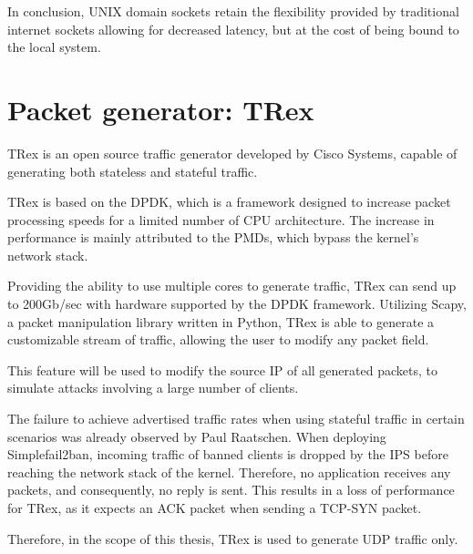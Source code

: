 In conclusion, UNIX domain sockets retain the flexibility provided by traditional internet sockets allowing for decreased latency, but at the cost of being bound to the local system.

\section{Packet generator: TRex}
TRex is an open source traffic generator developed by Cisco Systems, capable of generating both stateless and stateful traffic\cite{trex}.

TRex is based on the \ac{DPDK}, which is a framework designed to increase packet processing speeds for a limited number of \ac{CPU} architecture.
The increase in performance is mainly attributed to the \ac{PMDs}, which bypass the kernel's network stack.\cite{dpdk}

Providing the ability to use multiple cores to generate traffic, TRex can send up to 200Gb/sec with hardware supported by the \ac{DPDK} framework.
Utilizing Scapy, a packet manipulation library written in Python\cite{scapy}, TRex is able to generate a customizable stream of traffic, allowing the user to modify any packet field.\cite{trex}

This feature will be used to modify the source \ac{IP} of all generated packets, to simulate attacks involving a large number of clients.

The failure to achieve advertised traffic rates when using stateful traffic in certain scenarios was already observed by Paul Raatschen.
When deploying Simplefail2ban, incoming traffic of banned clients is dropped by the \ac{IPS} before reaching the network stack of the kernel.
Therefore, no application receives any packets, and consequently, no reply is sent.
This results in a loss of performance for TRex, as it expects an \ac{ACK} packet when sending a \ac{TCP-SYN} packet.\cite{raatschen:ipc}

Therefore, in the scope of this thesis, TRex is used to generate \ac{UDP} traffic only.

